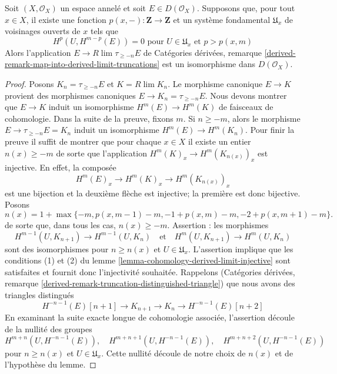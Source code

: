 {\begin{lemma}
\label{lemma-is-limit-per-point}

Soit $(X, \mathcal{O}_X)$ un espace annelé et soit $E \in D(\mathcal{O}_X)$. Supposons que, pour tout $x \in X$, il existe une fonction $p(x, -) : \mathbf{Z} \to \mathbf{Z}$ et un système fondamental $\mathfrak{U}_x$ de voisinages ouverts de $x$
tels que
$$
H^p(U, H^{m - p}(E)) = 0 \text{ pour }
U \in \mathfrak{U}_x \text{ et } p > p(x, m)
$$
Alors l'application $E \to R\lim \tau_{\geq -n} E$ de Catégories dérivées, remarque
\ref{derived-remark-map-into-derived-limit-truncations}
est un isomorphisme dans $D(\mathcal{O}_X)$.

\end{lemma}

\begin{proof}

Posons $K_n = \tau_{\geq -n}E$ et $K = R\lim K_n$. Le morphisme canonique $E \to K$
provient des morphismes canoniques $E \to K_n = \tau_{\geq -n}E$. Nous devons montrer que $E \to K$ induit un isomorphisme
$H^m(E) \to H^m(K)$ de faisceaux de cohomologie. Dans la suite de la preuve, fixons $m$. Si $n \geq -m$, alors le morphisme $E \to \tau_{\geq -n}E = K_n$ induit un isomorphisme
$H^m(E) \to H^m(K_n)$. Pour finir la preuve il suffit de montrer que pour chaque $x \in X$
il existe un entier $n(x) \geq -m$ de sorte que l'application
$H^m(K)_x \to H^m(K_{n(x)})_x$ est injective. En effet, la composée
$$
H^m(E)_x \to H^m(K)_x \to H^m(K_{n(x)})_x
$$
est une bijection et la deuxième flèche est injective; la première est donc bijective. Posons
$$
n(x) = 1 + \max\{-m, p(x, m - 1) - m, -1 + p(x, m) - m, -2 + p(x, m + 1) - m\}.
$$
de sorte que, dans tous les cas, $n(x) \geq -m$. Assertion : les morphismes
$$
H^{m - 1}(U, K_{n + 1}) \to H^{m - 1}(U, K_n)
\quad\text{et}\quad
H^m(U, K_{n + 1}) \to H^m(U, K_n)
$$
sont des isomorphismes pour $n \geq n(x)$ et $U \in \mathfrak{U}_x$. L'assertion implique que les conditions (1) et (2) du lemme \ref{lemma-cohomology-derived-limit-injective}
sont satisfaites et fournit donc l'injectivité souhaitée. Rappelons (Catégories dérivées, remarque
\ref{derived-remark-truncation-distinguished-triangle}) que nous avons des triangles distingués
$$
H^{-n - 1}(E)[n + 1] \to
K_{n + 1} \to K_n \to H^{-n - 1}(E)[n + 2]
$$
En examinant la suite exacte longue de cohomologie associée, l'assertion découle de la nullité des groupes
$$
H^{m + n}(U, H^{-n - 1}(E)),\quad
H^{m + n + 1}(U, H^{-n - 1}(E)),\quad
H^{m + n + 2}(U, H^{-n - 1}(E))
$$
pour $n \geq n(x)$ et $U \in \mathfrak{U}_x$. Cette nullité découle de notre choix de $n(x)$
et de l'hypothèse du lemme.


\end{proof}}
